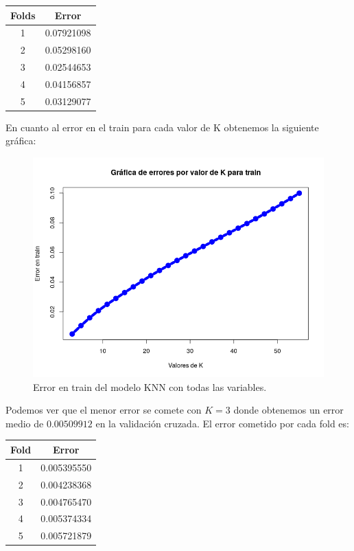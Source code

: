 \documentclass[12pt,a4paper]{article}
\begin{document}
\begin{table}[H]
	\centering
	\begin{tabular}{|c|c|}
		\hline
		\textbf{Folds} & \textbf{Error} \\ \hline
		1              & 0.07921098     \\ \hline
		2              & 0.05298160     \\ \hline
		3              & 0.02544653     \\ \hline
		4              & 0.04156857     \\ \hline
		5              & 0.03129077     \\ \hline
	\end{tabular}
\end{table}

En cuanto al error en el train para cada valor de K obtenemos la siguiente gráfica:

\begin{figure}[H]
	\centering 
	\includegraphics[scale=0.6]{./Imagenes/Regresion/knn2.png}
	\caption{Error en train del modelo KNN con todas las variables.}
\end{figure}

Podemos ver que el menor error se comete con $K=3$ donde obtenemos un error medio de $0.00509912$ en la validación cruzada. El error cometido por cada fold es:

\begin{table}[H]
	\centering
	\begin{tabular}{|c|c|}
		\hline
		\textbf{Fold} & \textbf{Error} \\ \hline
		1              & 0.005395550     \\ \hline
		2              & 0.004238368     \\ \hline
		3              & 0.004765470     \\ \hline
		4              & 0.005374334     \\ \hline
		5              & 0.005721879     \\ \hline
	\end{tabular}
\end{table}
\end{document}
